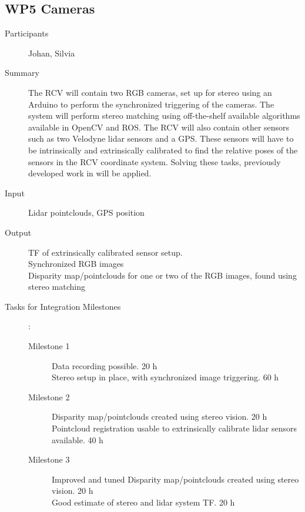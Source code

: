 \documentclass[11pt,a4paper]{article}
\begin{document}
\subsection{WP5 Cameras} %
\begin{description}
\item[Participants] Johan, Silvia
\item[Summary]

The RCV will contain two RGB cameras, set up for stereo using an Arduino to perform the synchronized triggering of the cameras. The system will perform stereo matching using off-the-shelf available algorithms available in OpenCV and ROS. The RCV will also contain other sensors such as two Velodyne lidar sensors and a GPS. These sensors will have to be intrinsically and extrinsically calibrated to find the relative poses of the sensors in the RCV coordinate system. Solving these tasks, previously developed work in \cite{} will be applied. 

\item[Input]
	Lidar pointclouds, GPS position 
\item[Output]
	TF of extrinsically calibrated sensor setup.  \\
	Synchronized RGB images \\
	Disparity map/pointclouds for one or two of the RGB images, found using stereo matching \\
\item[Tasks for Integration Milestones]:\
	\begin{description}
		\item[Milestone 1]
			Data recording possible. 20 h\\
			
			Stereo setup in place, with synchronized image triggering. 60 h \\
		\item[Milestone 2]
			Disparity map/pointclouds created using stereo vision. 20 h \\
			
			Pointcloud registration usable to extrinsically calibrate lidar sensors available. 40 h \\
		\item[Milestone 3]
			Improved and tuned Disparity map/pointclouds created using stereo vision. 20 h \\
			
			Good estimate of stereo and lidar system TF. 20 h \\
	\end{description}	 
\end{description}
\end{document}
